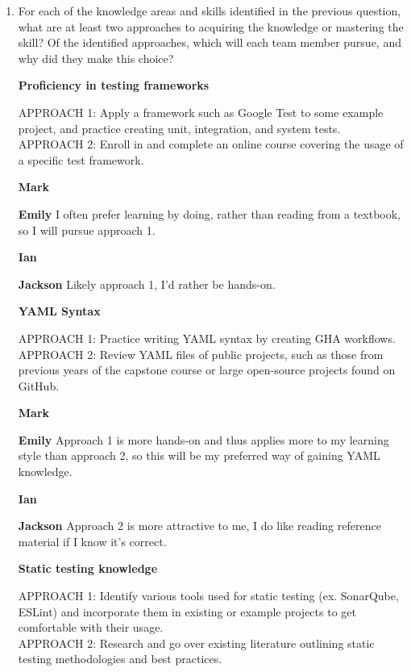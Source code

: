 \documentclass[12pt, titlepage]{article}
\begin{document}
\begin{enumerate}[leftmargin=*]
  \item For each of the knowledge areas and skills identified in the previous
  question, what are at least two approaches to acquiring the knowledge or
  mastering the skill?  Of the identified approaches, which will each team
  member pursue, and why did they make this choice? 

  \vspace{5pt}
  \textbf{Proficiency in testing frameworks}

  APPROACH 1: Apply a framework such as Google Test to some example project, and practice creating unit, integration, and system tests. \\
  APPROACH 2: Enroll in and complete an online course covering the usage of a specific test framework.
  
  \textbf{Mark}

  \textbf{Emily} I often prefer learning by doing, rather than reading from a textbook, so I will pursue approach 1.

  \textbf{Ian}

  \textbf{Jackson} Likely approach 1, I’d rather be hands-on.

  \vspace{10pt}
  \textbf{YAML Syntax}

  APPROACH 1: Practice writing YAML syntax by creating GHA workflows. \\
  APPROACH 2: Review YAML files of public projects, such as those from previous years of the capstone course or large open-source projects found on GitHub.
  
  \textbf{Mark}

  \textbf{Emily} Approach 1 is more hands-on and thus applies more to my learning style than approach 2, so this will be my preferred way of gaining YAML knowledge.

  \textbf{Ian}

  \textbf{Jackson} Approach 2 is more attractive to me, I do like reading reference material if I know it's correct.

  \vspace{10pt}
  \textbf{Static testing knowledge}

  APPROACH 1: Identify various tools used for static testing (ex. SonarQube, ESLint) and incorporate them in existing or example projects to get comfortable with their usage. \\
  APPROACH 2: Research and go over existing literature outlining static testing methodologies and best practices.


\end{enumerate}
\end{document}
